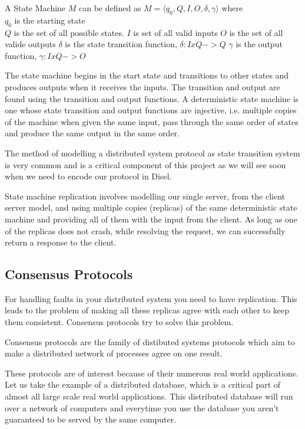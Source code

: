 A State Machine $M$ can be defined as $M = \langle q_0, Q, I, O, \delta, \gamma \rangle$ where \\
$q_0$ is the starting state \\
$Q$ is the set of all possible states.
$I$ is set of all valid inputs
$O$ is the set of all valide outputs
$\delta$ is the state transition function, $\delta : I x Q -> Q$
$\gamma$ is the output function, $\gamma : I x Q -> O$

The state machine begins in the start state and transitions to other states and
produces outputs when it receives the inputs. The transition and output are found
using the transition and output functions. A deterministic state machine is one
whose state transition and output functions are injective, i.e. multiple
copies of the machine when given the same input, pass through the same order of states
and produce the same output in the same order.

The method of modelling a distributed system protocol as state transition system
is very common and is a critical component of this project as we will see soon when
we need to encode our protocol in Disel.

State machine replication involves modelling our single server, from the client
server model, and using multiple copies (replicas) of the same deterministic
state machine and providing all of them with the input from the client.
As long as one of the replicas does not crash, while resolving the request,
we can successfully return a response to the client.


\subsection{Consensus Protocols}
For handling faults in your distributed system you need to have replication.
This leads to the problem of making all these replicas agree with each other
to keep them consistent. Consensus protocols try to solve this problem.

Consensus protocols are the family of distibuted systems protocols which aim to
make a distributed network of processes agree on one result.

These protocols are of interest because of their numerous real world applications.
Let us take the example of a distributed database, which is a critical part of almost
all large scale real world applications. This distributed database will run
over a network of computers and everytime you use the database you aren't guaranteed
to be served by the same computer.

